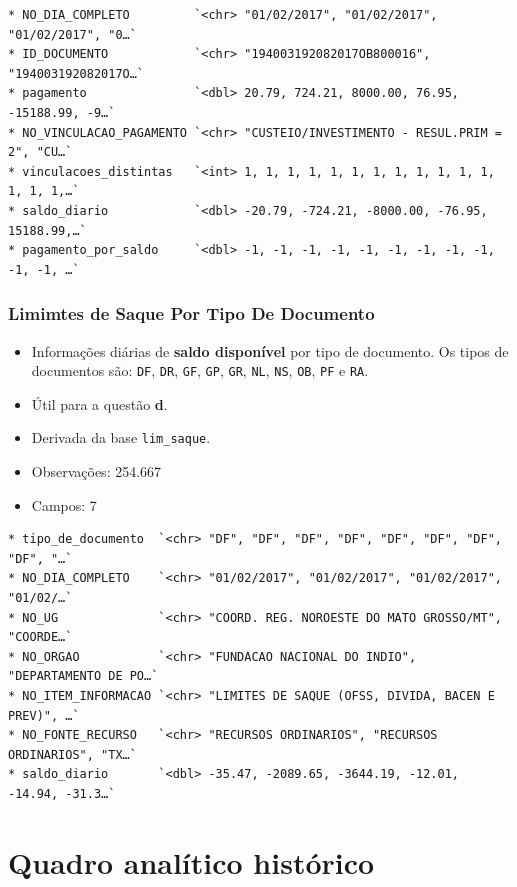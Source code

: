\documentclass[]{book}
\begin{document}
\begin{verbatim}
* NO_DIA_COMPLETO         `<chr> "01/02/2017", "01/02/2017", "01/02/2017", "0…`
* ID_DOCUMENTO            `<chr> "194003192082017OB800016", "194003192082017O…`
* pagamento               `<dbl> 20.79, 724.21, 8000.00, 76.95, -15188.99, -9…`
* NO_VINCULACAO_PAGAMENTO `<chr> "CUSTEIO/INVESTIMENTO - RESUL.PRIM = 2", "CU…`
* vinculacoes_distintas   `<int> 1, 1, 1, 1, 1, 1, 1, 1, 1, 1, 1, 1, 1, 1, 1,…`
* saldo_diario            `<dbl> -20.79, -724.21, -8000.00, -76.95, 15188.99,…`
* pagamento_por_saldo     `<dbl> -1, -1, -1, -1, -1, -1, -1, -1, -1, -1, -1, …`
\end{verbatim}

\hypertarget{limimtes-de-saque-por-tipo-de-documento}{%
\subsection{Limimtes de Saque Por Tipo De Documento}\label{limimtes-de-saque-por-tipo-de-documento}}

\begin{itemize}
\item
  Informações diárias de \textbf{saldo disponível} por tipo de documento. Os tipos de documentos são: \texttt{DF}, \texttt{DR}, \texttt{GF}, \texttt{GP}, \texttt{GR}, \texttt{NL}, \texttt{NS}, \texttt{OB}, \texttt{PF} e \texttt{RA}.
\item
  Útil para a questão \textbf{d}.
\item
  Derivada da base \texttt{lim\_saque}.
\item
  Observações: 254.667
\item
  Campos: 7
\end{itemize}

\begin{verbatim}
* tipo_de_documento  `<chr> "DF", "DF", "DF", "DF", "DF", "DF", "DF", "DF", "…`
* NO_DIA_COMPLETO    `<chr> "01/02/2017", "01/02/2017", "01/02/2017", "01/02/…`
* NO_UG              `<chr> "COORD. REG. NOROESTE DO MATO GROSSO/MT", "COORDE…`
* NO_ORGAO           `<chr> "FUNDACAO NACIONAL DO INDIO", "DEPARTAMENTO DE PO…`
* NO_ITEM_INFORMACAO `<chr> "LIMITES DE SAQUE (OFSS, DIVIDA, BACEN E PREV)", …`
* NO_FONTE_RECURSO   `<chr> "RECURSOS ORDINARIOS", "RECURSOS ORDINARIOS", "TX…`
* saldo_diario       `<dbl> -35.47, -2089.65, -3644.19, -12.01, -14.94, -31.3…`
\end{verbatim}

\hypertarget{quadro-analuxedtico-histuxf3rico}{%
\chapter{Quadro analítico histórico}\label{quadro-analuxedtico-histuxf3rico}}
\end{document}
